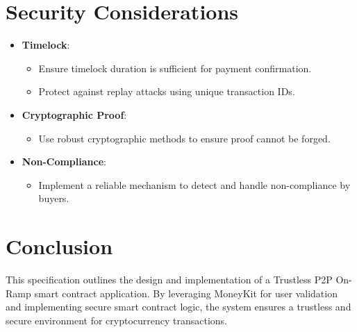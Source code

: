 \documentclass[11pt,oneside,a4paper]{article}
\begin{document}
\section{Security Considerations}

\begin{itemize}
  \item \textbf{Timelock}:
        \begin{itemize}
          \item Ensure timelock duration is sufficient for payment confirmation.
          \item Protect against replay attacks using unique transaction IDs.
        \end{itemize}

  \item \textbf{Cryptographic Proof}:
        \begin{itemize}
          \item Use robust cryptographic methods to ensure proof cannot be forged.
        \end{itemize}

  \item \textbf{Non-Compliance}:
        \begin{itemize}
          \item Implement a reliable mechanism to detect and handle non-compliance by buyers.
        \end{itemize}
\end{itemize}

\section{Conclusion}

This specification outlines the design and implementation of a Trustless P2P On-Ramp smart contract application. By leveraging MoneyKit for user validation and implementing secure smart contract logic, the system ensures a trustless and secure environment for cryptocurrency transactions.
\end{document}
